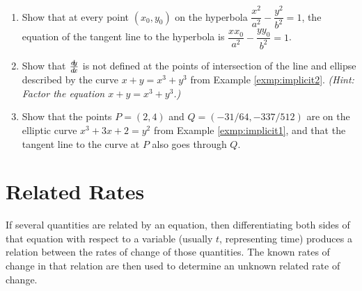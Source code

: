 {\begin{enumerate}[\bfseries 1.]
 \item\label{exer:hyptan} Show that at every point $(x_0,y_0)$ on the hyperbola
  $\dfrac{x^2}{a^2} - \dfrac{y^2}{b^2} = 1$,
  the equation of the  tangent line to the hyperbola is
  $\dfrac{x x_0}{a^2} - \dfrac{y y_0}{b^2} = 1$.
 \item Show that $\frac{d\negmedspace y}{d\!x}$ is not defined at the points of intersection of the
  line and ellipse described by the curve $x+y=x^3+y^3$ from Example
  \ref{exmp:implicit2}. \emph{(Hint: Factor the equation $x+y=x^3+y^3$.)}
 \item Show that the points $P=(2,4)$ and $Q=(-31/64,-337/512)$ are on the
  elliptic curve $x^3+3x+2=y^2$ from Example \ref{exmp:implicit1}, and that the
  tangent line to the curve at $P$ also goes through $Q$.
\end{enumerate}
}
\newpage
\section{Related Rates}\label{sec:related-rates}
If several quantities are related by an equation, then differentiating both
sides of that equation with respect to a variable (usually $t$, representing
time) produces a relation between the rates of change of those quantities.
The known rates of change in that relation are then used to determine an
unknown related rate of change.

